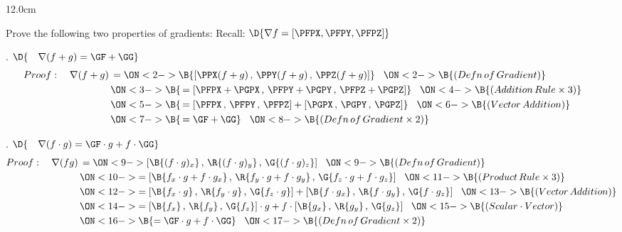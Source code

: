 \begin{frame}
\begin{columns}\begin{column}{12.0cm}

\vspace{0.1cm}

\scriptsize

Prove the following two properties of gradients: \qquad Recall:  $\D{\nabla f = \left[\PFPX,\PFPY,\PFPZ \right]}$

. $\D{\quad \nabla(f+g) = \GF + \GG}$
\begin{align*}
Proof: \quad \nabla(f+g)
&\,=
\ON<2->{\B{ \left[\PPX(f+g)\,,\,\PPY(f+g)\,,\,\PPZ(f+g)\right] }} \hspace{0.3cm} 
\ON<2->{\B{(Defn \, of \, Gradient)}} \hspace{1.9cm}\\
&\,
\ON<3->{\B{\, = \left[\PFPX+\PGPX\,,\,\PFPY+\PGPY\,,\,\PFPZ+\PGPZ\right]}} \hspace{0.3cm} 
\ON<4->{\B{(Addition \, Rule \times3)}} \\
&\,
\ON<5->{\B{\, = \left[\PFPX\,,\,\PFPY\,,\,\PFPZ\right] + \left[\PGPX\,,\,\PGPY\,,\,\PGPZ\right]}} \hspace{0.3cm} 
\ON<6->{\B{(Vector \, Addition)}}\\
&\,
\ON<7->{\B{\, = \GF + \GG}} \hspace{0.3cm} 
\ON<8->{\B{(Defn \, of \, Gradient \times 2)}}
\end{align*}

\vspace{0.4cm}

. $\D{\quad \nabla(f \cdot g) = \GF \cdot g + f \cdot \GG}$
\begin{align*}
Proof: \quad \nabla(fg)
&\,=
\ON<9->{\left[\B{(f \cdot g)_x}\,,\,\R{(f \cdot g)_y}\,,\,\G{(f \cdot g)_z}\right] }\hspace{0.3cm} 
\ON<9->{\B{(Defn \, of \, Gradient)}} \hspace{3.1cm}\\
&\,
\ON<10->{= \left[\B{f_x \cdot g + f  \cdot g_x}\,,\,\R{f_y \cdot g + f \cdot g_y}\,,\,\G{f_z \cdot g + f \cdot g_z}\right]}\hspace{0.3cm} 
\ON<11->{\B{(Product \, Rule \times3)}}\\
&\,
\ON<12->{= \left[\B{f_x \cdot g}\,,\,\R{f_y\cdot g}\,,\,\G{f_z\cdot g}\right] + \left[\B{f \cdot g_x}\,,\,\R{f \cdot g_y}\,,\,\G{f \cdot g_z}\right]} \hspace{0.3cm} 
\ON<13->{\B{(Vector \, Addition)}}\\
&\,
\ON<14->{= \left[\B{f_x} \,,\,\R{f_y}\,,\,\G{f_z}\right] \cdot g + f \cdot \left[\B{g_x}\,,\,\R{g_y}\,,\,\G{g_z}\right]} \hspace{0.3cm} 
\ON<15->{\B{(Scalar \cdot Vector)}}\\
&\,
\ON<16->{\B{= \GF \cdot g + f \cdot \GG}} \hspace{0.3cm} 
\ON<17->{\B{(Defn \, of \, Gradient \times 2)}}
\\
\end{align*}


\end{column}
\end{columns}
\end{frame}
